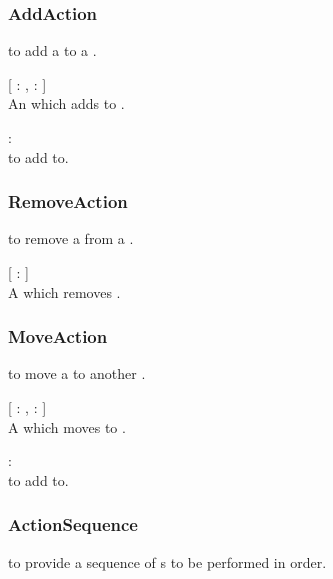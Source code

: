 \subsubsection{AddAction}
   to add a  to a .

\begin{dlist}
  \item {}[  : ,  :  ]\\
  An  which adds  to .
  
  \item {} : \\
   to add  to.
\end{dlist}

\subsubsection{RemoveAction}
   to remove a  from a .

\begin{dlist}
  \item {}[  :  ]\\
  A  which removes .
\end{dlist}

\subsubsection{MoveAction}
   to move a  to another .

\begin{dlist}
  \item {}[  : ,  :  ]\\
  A  which moves  to .
  
  \item {} : \\
   to add  to.
\end{dlist}

\subsubsection{ActionSequence}
   to provide a sequence of s to be performed in order.

